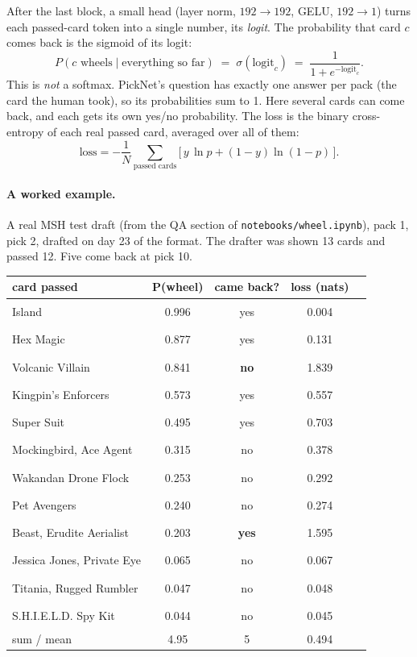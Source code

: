 \documentclass[11pt,letterpaper]{article}
\newcommand{\code}[1]{\texttt{\small #1}}
\begin{document}
After the last block, a small head (layer norm, $192\to192$, GELU, $192\to1$) turns each passed-card token into
a single number, its \emph{logit}. The probability that card $c$ comes back is the sigmoid of its logit:
\[
P(c \text{ wheels} \mid \text{everything so far}) \;=\; \sigma(\text{logit}_c) \;=\; \frac{1}{1+e^{-\text{logit}_c}}.
\]
This is \emph{not} a softmax. PickNet's question has exactly one answer per pack (the card the human took),
so its probabilities sum to 1. Here several cards can come back, and each gets its own yes/no probability.
The loss is the binary cross-entropy of each real passed card, averaged over all of them:
\[
\text{loss} = -\frac{1}{N}\sum_{\text{passed cards}} \Big[\, y\,\ln p + (1-y)\ln(1-p) \,\Big].
\]

\paragraph{A worked example.} A real MSH test draft (from the QA section of \code{notebooks/wheel.ipynb}),
pack 1, pick 2, drafted on day 23 of the format. The drafter was shown 13 cards and passed 12. Five come back
at pick 10.

\begin{center}\small
\begin{tabular}{lccc l}
\toprule
card passed & P(wheel) & came back? & loss (nats) & \\
\midrule
Island & 0.996 & yes & 0.004 & \textcolor{cblue}{\rule{2.99cm}{6pt}} \\
Hex Magic & 0.877 & yes & 0.131 & \textcolor{cblue}{\rule{2.63cm}{6pt}} \\
Volcanic Villain & 0.841 & \textbf{no} & 1.839 & \textcolor{cgray}{\rule{2.52cm}{6pt}} \\
Kingpin's Enforcers & 0.573 & yes & 0.557 & \textcolor{cblue}{\rule{1.72cm}{6pt}} \\
Super Suit & 0.495 & yes & 0.703 & \textcolor{cblue}{\rule{1.49cm}{6pt}} \\
Mockingbird, Ace Agent & 0.315 & no & 0.378 & \textcolor{cgray}{\rule{0.95cm}{6pt}} \\
Wakandan Drone Flock & 0.253 & no & 0.292 & \textcolor{cgray}{\rule{0.76cm}{6pt}} \\
Pet Avengers & 0.240 & no & 0.274 & \textcolor{cgray}{\rule{0.72cm}{6pt}} \\
Beast, Erudite Aerialist & 0.203 & \textbf{yes} & 1.595 & \textcolor{cblue}{\rule{0.61cm}{6pt}} \\
Jessica Jones, Private Eye & 0.065 & no & 0.067 & \textcolor{cgray}{\rule{0.20cm}{6pt}} \\
Titania, Rugged Rumbler & 0.047 & no & 0.048 & \textcolor{cgray}{\rule{0.14cm}{6pt}} \\
S.H.I.E.L.D. Spy Kit & 0.044 & no & 0.045 & \textcolor{cgray}{\rule{0.13cm}{6pt}} \\
\midrule
sum / mean & 4.95 & 5 & 0.494 & \\
\bottomrule
\end{tabular}
\end{center}
\end{document}
